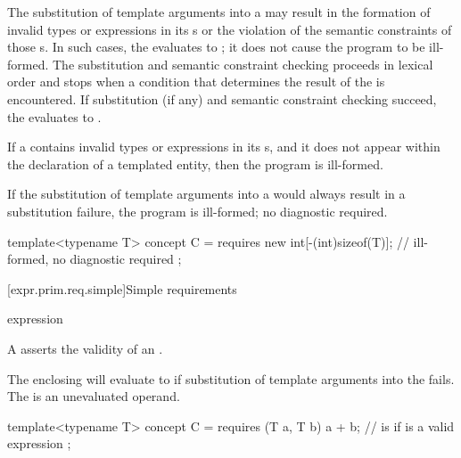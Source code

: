 \pnum
The substitution of template arguments into a 
may result in the formation of invalid types or expressions in its
s or the violation of the semantic constraints of those s.
In such cases, the  evaluates to ;
it does not cause the program to be ill-formed.
The substitution and semantic constraint checking
proceeds in lexical order and stops when a condition that
determines the result of the  is encountered.
If substitution (if any) and semantic constraint checking succeed,
the  evaluates to .
\begin{note}
If a  contains invalid types or expressions in
its s, and it does not appear within the declaration of a templated
entity, then the program is ill-formed.
\end{note}
If the substitution of template arguments into a 
would always result in a substitution failure, the program is ill-formed;
no diagnostic required.
\begin{example}
\begin{codeblock}
template<typename T> concept C =
requires {
  new int[-(int)sizeof(T)];     // ill-formed, no diagnostic required
};
\end{codeblock}
\end{example}

[expr.prim.req.simple]{Simple requirements}
%

\begin{bnf}
\br
    expression \terminal{;}
\end{bnf}

\pnum
A  asserts
the validity of an .
\begin{note}
The enclosing  will evaluate to 
if substitution of template arguments into the  fails.
The  is an unevaluated operand.
\end{note}
\begin{example}
\begin{codeblock}
template<typename T> concept C =
  requires (T a, T b) {
    a + b;          //  is  if  is a valid expression
  };
\end{codeblock}
\end{example}


